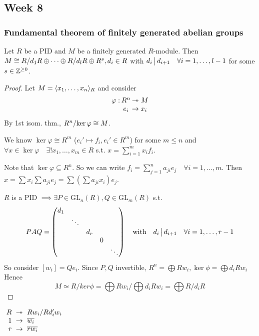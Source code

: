 \subsection{Week 8}
\subsubsection{Fundamental theorem of finitely generated abelian groups}

\begin{theorem}
  Let $R$ be a PID and $M$ be a finitely generated $R$-module.
  Then $M \cong {R}/{d_1 R} \oplus \dots \oplus {R}/{d_l R} \oplus R^s,
  d_i \in R$ with $d_i \,\big|\, d_{i+1} \quad \forall i = 1, \dots, l-1$
  for some $s \in \mathbb{Z}^{\ge 0}$.

  \begin{proof}
    Let $M = \langle x_1, \dots, x_n\rangle_R$ and consider
    \[
      \arraycolsep=1pt
      \begin{array}{rcl}
        \varphi: & R^n & \onto M \\
                 & e_i & \to x_i
      \end{array}
    \]
    By 1st isom. thm., ${R^n}/{\ker \varphi} \cong M$.

    We know $\ker \varphi \cong R^m$ ($e_i' \mapsto f_i, e_i' \in R^m$)
    for some $m \le n$ and
    $\forall x \in \ker\varphi \quad \exists! x_1, \dots, x_m \in R$ s.t.
    $x = \sum_{i=1}^m x_i f_i$.

    Note that $\ker \varphi \subseteq R^n$. So we can write
    $f_i = \sum_{j=1}^n a_{ji}e_j \quad \forall i = 1,\dots, m$.
    Then $x = \sum x_i \sum a_{ji}e_j =
    \sum \left(\sum a_{ji}x_i\right) e_j$.

    $R$ is a PID $\implies \exists P \in \text{GL}_n(R), Q \in \text{GL}_m(R)$
    s.t.
    \[
      PAQ = \begin{pmatrix}
      d_1 \\
      & \ddots \\
      & & d_r \\
      & & & 0 \\
      & & & & \ddots
      \end{pmatrix}
      \quad \text{with} \quad
      d_i \,\big|\, d_{i+1} \quad \forall i = 1, \dots, r-1
    \]
    So consider $[w_i] = Q e_i$. Since $P, Q$ invertible, $R^n = \bigoplus R w_i, \ker \phi = \bigoplus d_i R w_i$
    Hence
    \[ M \simeq R / ker \phi = \bigoplus R w_i / \bigoplus d_i R w_i = \bigoplus R / d_i R \]
  \end{proof}

  $\arraycolsep=3pt
  \begin{array}{rcl}
    R & \onto & \quot{Rw_i}{Rd_i'w_i} \\
    1 & \to & \ob{w_i} \\
    r & \to & \ob{rw_i}
  \end{array}
    $
\end{theorem}

